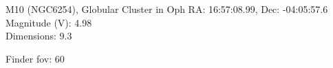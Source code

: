 \begin{block}{M10 (NGC6254), Globular Cluster in Oph}
    RA: 16:57:08.99, Dec: -04:05:57.6 \\ 
    Magnitude (V): 4.98 \\ 
    Dimensions: 9.3 

    Finder fov: 60 
\end{block}